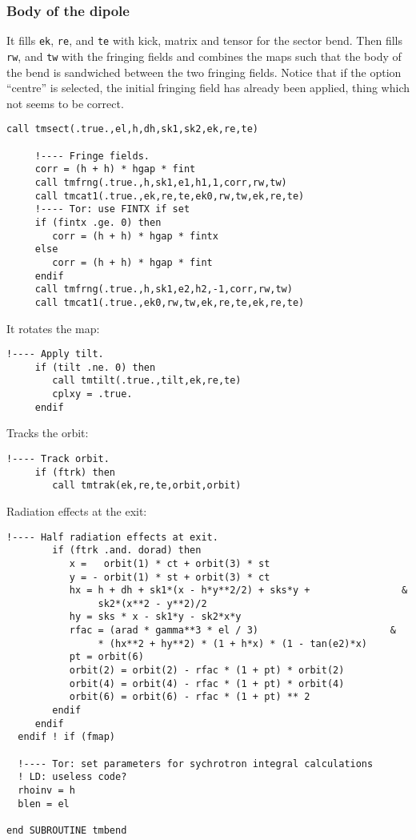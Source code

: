 \documentclass{cern-art} %
\renewcommand{\L}[1]{\lstinline[firstnumber=last]{#1}}
\begin{document}
\subsubsection{Body of the dipole}
  It fills  \L{ek},  \L{re}, and \L{te} with kick, matrix and tensor for the sector bend. Then fills  \L{rw}, and \L{tw} with the fringing fields and combines the maps such that the body of the bend is sandwiched between the two fringing fields. Notice that if the option ``centre'' is selected, the initial fringing field has  already been applied, thing which not seems to be correct.  
   \begin{lstlisting}[firstnumber=last]
     call tmsect(.true.,el,h,dh,sk1,sk2,ek,re,te)

     !---- Fringe fields.
     corr = (h + h) * hgap * fint
     call tmfrng(.true.,h,sk1,e1,h1,1,corr,rw,tw)
     call tmcat1(.true.,ek,re,te,ek0,rw,tw,ek,re,te)
     !---- Tor: use FINTX if set
     if (fintx .ge. 0) then
        corr = (h + h) * hgap * fintx
     else
        corr = (h + h) * hgap * fint
     endif
     call tmfrng(.true.,h,sk1,e2,h2,-1,corr,rw,tw)
     call tmcat1(.true.,ek0,rw,tw,ek,re,te,ek,re,te)
\end{lstlisting}
It rotates the map:
\begin{lstlisting}[firstnumber=last]
     !---- Apply tilt.
     if (tilt .ne. 0) then
        call tmtilt(.true.,tilt,ek,re,te)
        cplxy = .true.
     endif
\end{lstlisting}
Tracks the orbit:
\begin{lstlisting}[firstnumber=last]
     !---- Track orbit.
     if (ftrk) then
        call tmtrak(ek,re,te,orbit,orbit)
\end{lstlisting}
Radiation effects at the exit:
\begin{lstlisting}[firstnumber=last]
        !---- Half radiation effects at exit.
        if (ftrk .and. dorad) then
           x =   orbit(1) * ct + orbit(3) * st
           y = - orbit(1) * st + orbit(3) * ct
           hx = h + dh + sk1*(x - h*y**2/2) + sks*y +                &
                sk2*(x**2 - y**2)/2
           hy = sks * x - sk1*y - sk2*x*y
           rfac = (arad * gamma**3 * el / 3)                       &
                * (hx**2 + hy**2) * (1 + h*x) * (1 - tan(e2)*x)
           pt = orbit(6)
           orbit(2) = orbit(2) - rfac * (1 + pt) * orbit(2)
           orbit(4) = orbit(4) - rfac * (1 + pt) * orbit(4)
           orbit(6) = orbit(6) - rfac * (1 + pt) ** 2
        endif
     endif
  endif ! if (fmap)

  !---- Tor: set parameters for sychrotron integral calculations
  ! LD: useless code?
  rhoinv = h
  blen = el

end SUBROUTINE tmbend
\end{lstlisting}
\end{document}
